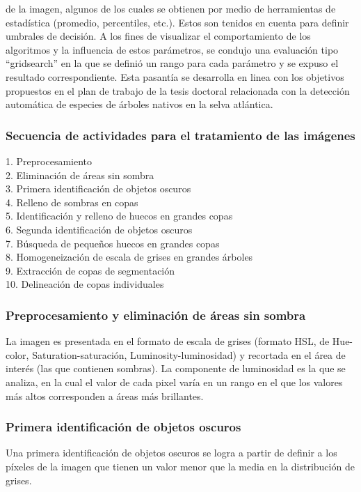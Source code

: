 de la imagen, algunos de los cuales se obtienen por medio de herramientas de estadística (promedio, percentiles, etc.). Estos son tenidos en cuenta para definir umbrales de decisión. A los fines de visualizar el comportamiento de los algoritmos y la influencia de estos parámetros, se condujo una evaluación tipo “gridsearch” en la que se definió un rango para cada parámetro y se expuso el resultado correspondiente. Esta pasantía se desarrolla en linea con los objetivos propuestos en el plan de trabajo de la tesis doctoral relacionada con la detección automática de especies de árboles nativos en la selva atlántica. 

\subsubsection{Secuencia de actividades para el tratamiento de las imágenes} \label{Metodo Morfo} %

1. Preprocesamiento\\
2. Eliminación de áreas sin sombra\\
3. Primera identificación de objetos oscuros\\
4. Relleno de sombras en copas\\
5. Identificación y relleno de huecos en grandes copas\\
6. Segunda identificación de objetos oscuros\\
7. Búsqueda de pequeños huecos en grandes copas\\
8. Homogeneización de escala de grises en grandes árboles\\
9. Extracción de copas de segmentación\\
10.  Delineación de copas individuales\\

\subsubsection{Preprocesamiento y eliminación de áreas sin sombra}
La imagen es presentada en el formato de escala de grises (formato HSL, de Hue-color, Saturation-saturación, Luminosity-luminosidad) y recortada en el área de interés (las que contienen sombras). La componente de luminosidad es la que se analiza, en la cual el valor de cada pixel varía en un rango en el que los valores más altos corresponden a áreas más brillantes.
\subsubsection{Primera identificación de objetos oscuros}
Una primera identificación de objetos oscuros se logra a partir de definir a los píxeles de la imagen que tienen un valor menor que la media en la distribución de grises.
